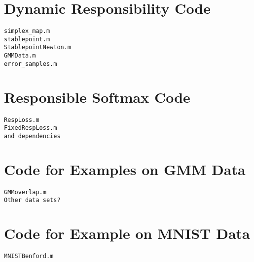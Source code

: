 \section{Dynamic Responsibility Code}
\begin{verbatim}
simplex_map.m
stablepoint.m
StablepointNewton.m
GMMData.m
error_samples.m
\end{verbatim}

\section{Responsible Softmax Code}
\begin{verbatim}
RespLoss.m 
FixedRespLoss.m
and dependencies
\end{verbatim}
\section{Code for Examples on GMM Data}
\begin{verbatim}
GMMoverlap.m 
Other data sets?
\end{verbatim}
\section{Code for Example on MNIST Data}
\begin{verbatim}
MNISTBenford.m
\end{verbatim}